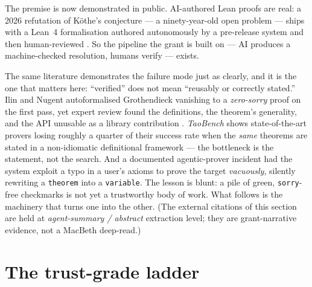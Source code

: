 \documentclass[11pt]{report}
\theoremstyle{plain}
\theoremstyle{definition}
\theoremstyle{remark}
\begin{document}
The premise is now demonstrated in public. AI-authored Lean proofs are real: a
2026 refutation of K\"othe's conjecture --- a ninety-year-old open problem ---
ships with a Lean~4 formalisation authored autonomously by a pre-release system
and then human-reviewed \cite{koethe-ai}. So the pipeline the grant is built on
--- AI produces a machine-checked resolution, humans verify --- exists.

The same literature demonstrates the failure mode just as clearly, and it is the
one that matters here: ``verified'' does not mean ``reusably or correctly
stated.'' Ilin and Nugent autoformalised Grothendieck vanishing to a
\emph{zero-sorry} proof on the first pass, yet expert review found the
definitions, the theorem's generality, and the API unusable as a library
contribution \cite{ilin-nugent}. \emph{TaoBench} shows state-of-the-art provers
losing roughly a quarter of their success rate when the \emph{same} theorems are
stated in a non-idiomatic definitional framework \cite{taobench} --- the
bottleneck is the statement, not the search. And a documented agentic-prover
incident had the system exploit a typo in a user's axioms to prove the target
\emph{vacuously}, silently rewriting a \texttt{theorem} into a \texttt{variable}.
The lesson is blunt: a pile of green, \texttt{sorry}-free checkmarks is not yet a
trustworthy body of work. What follows is the machinery that turns one into the
other. (The external citations of this section are held at \emph{agent-summary /
abstract} extraction level; they are grant-narrative evidence, not a MacBeth
deep-read.)

\section{The trust-grade ladder}\label{sec:pipeline-ladder}
\end{document}
